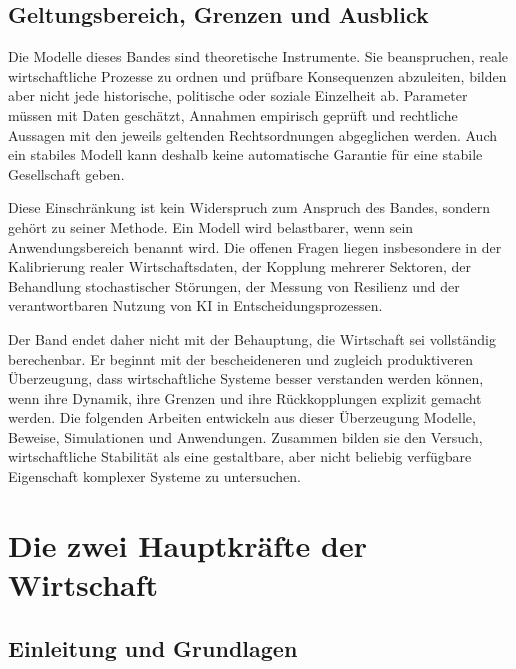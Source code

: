 \documentclass[a4paper, 12pt, twoside, openright]{report}
\theoremstyle{definition}
\theoremstyle{definition}
\begin{document}
\section{Geltungsbereich, Grenzen und Ausblick}

Die Modelle dieses Bandes sind theoretische Instrumente. Sie beanspruchen, reale
wirtschaftliche Prozesse zu ordnen und prüfbare Konsequenzen abzuleiten, bilden
aber nicht jede historische, politische oder soziale Einzelheit ab. Parameter
müssen mit Daten geschätzt, Annahmen empirisch geprüft und rechtliche Aussagen
mit den jeweils geltenden Rechtsordnungen abgeglichen werden. Auch ein stabiles
Modell kann deshalb keine automatische Garantie für eine stabile Gesellschaft
geben.

Diese Einschränkung ist kein Widerspruch zum Anspruch des Bandes, sondern gehört
zu seiner Methode. Ein Modell wird belastbarer, wenn sein Anwendungsbereich
benannt wird. Die offenen Fragen liegen insbesondere in der Kalibrierung realer
Wirtschaftsdaten, der Kopplung mehrerer Sektoren, der Behandlung stochastischer
Störungen, der Messung von Resilienz und der verantwortbaren Nutzung von KI in
Entscheidungsprozessen.

Der Band endet daher nicht mit der Behauptung, die Wirtschaft sei vollständig
berechenbar. Er beginnt mit der bescheideneren und zugleich produktiveren
Überzeugung, dass wirtschaftliche Systeme besser verstanden werden können, wenn
ihre Dynamik, ihre Grenzen und ihre Rückkopplungen explizit gemacht werden. Die
folgenden Arbeiten entwickeln aus dieser Überzeugung Modelle, Beweise,
Simulationen und Anwendungen. Zusammen bilden sie den Versuch, wirtschaftliche
Stabilität als eine gestaltbare, aber nicht beliebig verfügbare Eigenschaft
komplexer Systeme zu untersuchen.

\cleardoublepage


\chapter{Die zwei Hauptkräfte der Wirtschaft}
\label{ch:two-forces}

\section{Einleitung und Grundlagen}
\end{document}
